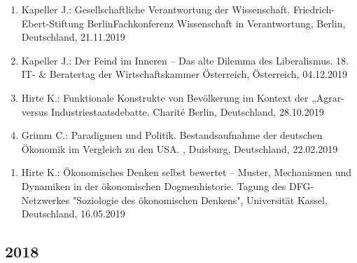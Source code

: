 \begin{enumerate}
	\item Kapeller J.: Gesellschaftliche Verantwortung der Wissenschaft. Friedrich-Ebert-Stiftung BerlinFachkonferenz Wissenschaft in Verantwortung, Berlin, Deutschland, 21.11.2019
	\item Kapeller J.: Der Feind im Inneren – Das alte Dilemma des Liberalismus. 18. IT- \& Beratertag der Wirtschaftskammer Österreich, Österreich, 04.12.2019
	\item Hirte K.: Funktionale Konstrukte von Bevölkerung im Kontext der „Agrar- versus Industriestaatsdebatte. Charité Berlin, Deutschland, 28.10.2019
	\item Grimm C.: Paradigmen und Politik. Bestandsaufnahme der deutschen Ökonomik im Vergleich zu den USA. , Duisburg, Deutschland, 22.02.2019
\end{enumerate}

\begin{enumerate}
	\item Hirte K.: Ökonomisches Denken selbst bewertet – Muster, Mechanismen und Dynamiken in der ökonomischen Dogmenhistorie. Tagung des DFG-Netzwerkes "Soziologie des ökonomischen Denkens", Universität Kassel, Deutschland, 16.05.2019
\end{enumerate}
\subsection*{2018}

